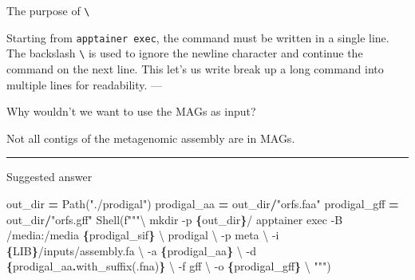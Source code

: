 \documentclass[
]{book}
\newenvironment{Shaded}{\begin{snugshade}}{\end{snugshade}}
\newcommand{\CharTok}[1]{\textcolor[rgb]{0.31,0.60,0.02}{#1}}
\newcommand{\NormalTok}[1]{#1}
\newcommand{\OperatorTok}[1]{\textcolor[rgb]{0.81,0.36,0.00}{\textbf{#1}}}
\newcommand{\SpecialCharTok}[1]{\textcolor[rgb]{0.81,0.36,0.00}{\textbf{#1}}}
\newcommand{\SpecialStringTok}[1]{\textcolor[rgb]{0.31,0.60,0.02}{#1}}
\newcommand{\StringTok}[1]{\textcolor[rgb]{0.31,0.60,0.02}{#1}}
\begin{document}
The purpose of \texttt{\textbackslash{}}

Starting from \texttt{apptainer\ exec}, the command must be written in a single line.
The backslash \texttt{\textbackslash{}} is used to ignore the newline character and continue the command on the next line.
This let's us write break up a long command into multiple lines for readability.
---

Why wouldn't we want to use the MAGs as input?

Not all contigs of the metagenomic assembly are in MAGs.

\begin{center}\rule{0.5\linewidth}{0.5pt}\end{center}

Suggested answer

\begin{Shaded}
\begin{Highlighting}[numbers=left,,]
\NormalTok{out\_dir }\OperatorTok{=}\NormalTok{ Path(}\StringTok{"./prodigal"}\NormalTok{)}
\NormalTok{prodigal\_aa }\OperatorTok{=}\NormalTok{ out\_dir}\OperatorTok{/}\StringTok{"orfs.faa"}
\NormalTok{prodigal\_gff }\OperatorTok{=}\NormalTok{ out\_dir}\OperatorTok{/}\StringTok{"orfs.gff"}
\NormalTok{Shell(}\SpecialStringTok{f"""}\CharTok{\textbackslash{}}
\SpecialStringTok{mkdir {-}p }\SpecialCharTok{\{}\NormalTok{out\_dir}\SpecialCharTok{\}}\SpecialStringTok{/}
\SpecialStringTok{apptainer exec {-}B /media:/media }\SpecialCharTok{\{}\NormalTok{prodigal\_sif}\SpecialCharTok{\}}\SpecialStringTok{ }\CharTok{\textbackslash{}}
\SpecialStringTok{    prodigal }\CharTok{\textbackslash{}}
\SpecialStringTok{        {-}p meta }\CharTok{\textbackslash{}}
\SpecialStringTok{        {-}i }\SpecialCharTok{\{}\NormalTok{LIB}\SpecialCharTok{\}}\SpecialStringTok{/inputs/assembly.fa }\CharTok{\textbackslash{}}
\SpecialStringTok{        {-}a }\SpecialCharTok{\{}\NormalTok{prodigal\_aa}\SpecialCharTok{\}}\SpecialStringTok{ }\CharTok{\textbackslash{}}
\SpecialStringTok{        {-}d }\SpecialCharTok{\{}\NormalTok{prodigal\_aa}\SpecialCharTok{.}\NormalTok{with\_suffix(}\StringTok{\textquotesingle{}.fna\textquotesingle{}}\NormalTok{)}\SpecialCharTok{\}}\SpecialStringTok{ }\CharTok{\textbackslash{}}
\SpecialStringTok{        {-}f gff }\CharTok{\textbackslash{}}
\SpecialStringTok{        {-}o }\SpecialCharTok{\{}\NormalTok{prodigal\_gff}\SpecialCharTok{\}}\SpecialStringTok{ }\CharTok{\textbackslash{}}
\SpecialStringTok{"""}\NormalTok{)}
\end{Highlighting}
\end{Shaded}
\end{document}
